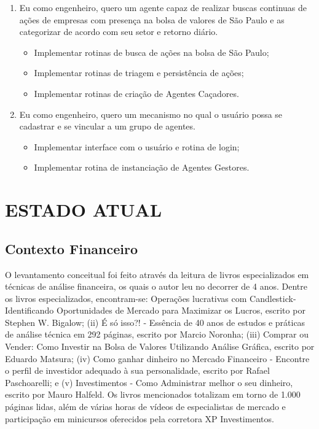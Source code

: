 \begin{enumerate}
\begin{itemize}
		\end{itemize}
\item Eu como engenheiro, quero um agente capaz de realizar buscas continuas de ações de empresas com presença na bolsa de valores de São Paulo e as categorizar de acordo com seu setor e retorno diário.
		\begin{itemize}
		\item Implementar rotinas de busca de ações na bolsa de São Paulo;
		\item Implementar rotinas de triagem e persistência de ações;
		\item Implementar rotinas de criação de Agentes Caçadores.
		\end{itemize}

\item Eu como engenheiro, quero um mecanismo no qual o usuário possa se cadastrar e se vincular a um grupo de agentes.
		\begin{itemize}
		\item Implementar interface com o usuário e rotina de login;
		\item Implementar rotina de instanciação de Agentes Gestores.
		\end{itemize}

\end{enumerate}

\section{ESTADO ATUAL}
\subsection{Contexto Financeiro}

O levantamento conceitual foi feito através da leitura de livros especializados em técnicas de análise financeira, os quais o autor leu no decorrer de 4 anos. Dentre os livros especializados, encontram-se: Operações lucrativas com Candlestick- Identificando Oportunidades de Mercado para Maximizar os Lucros, escrito por Stephen W. Bigalow; (ii) É só isso?! - Essência de 40 anos de estudos e práticas de análise técnica em 292 páginas, escrito por Marcio Noronha; (iii) Comprar ou Vender: Como Investir na Bolsa de Valores Utilizando Análise Gráfica, escrito por Eduardo Matsura; (iv) Como ganhar dinheiro no Mercado Financeiro - Encontre o perfil de investidor adequado à sua personalidade, escrito por Rafael Paschoarelli; e (v) Investimentos - Como Administrar melhor o seu dinheiro, escrito por Mauro Halfeld. Os livros mencionados totalizam em torno de 1.000 páginas lidas, além de várias horas de vídeos de especialistas de mercado e participação em minicursos oferecidos pela corretora XP Investimentos.


